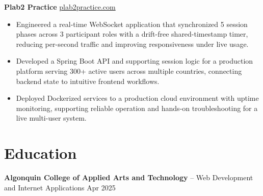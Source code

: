 \documentclass[11pt]{article}       %
\begin{document}
\textbf{Plab2 Practice} \hfill \href{https://plab2practice.com}{plab2practice.com} \\
\vspace{-9pt}
\begin{itemize}
  \item Engineered a real-time WebSocket application that synchronized 5 session phases across 3 participant roles with a drift-free shared-timestamp timer, reducing per-second traffic and improving responsiveness under live usage.
  \item Developed a Spring Boot API and supporting session logic for a production platform serving 300+ active users across multiple countries, connecting backend state to intuitive frontend workflows.
  \item Deployed Dockerized services to a production cloud environment with uptime monitoring, supporting reliable operation and hands-on troubleshooting for a live multi-user system.
\end{itemize}





\section*{Education}
\textbf{Algonquin College of Applied Arts and Technology} -- Web Development and Internet Applications
\hfill Apr 2025 \\
\end{document}
